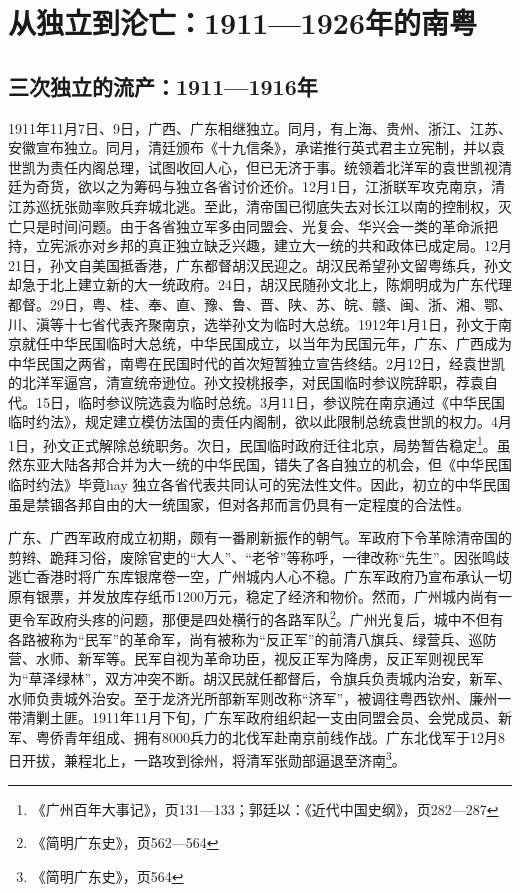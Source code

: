 \chapter{从独立到沦亡：1911—1926年的南粤}

\section{三次独立的流产：1911—1916年}

1911年11月7日、9日，广西、广东相继独立。同月，有上海、贵州、浙江、江苏、安徽宣布独立。同月，清廷颁布《十九信条》，承诺推行英式君主立宪制，并以袁世凯为责任内阁总理，试图收回人心，但已无济于事。统领着北洋军的袁世凯视清廷为奇货，欲以之为筹码与独立各省讨价还价。12月1日，江浙联军攻克南京，清江苏巡抚张勋率败兵弃城北逃。至此，清帝国已彻底失去对长江以南的控制权，灭亡只是时间问题。由于各省独立军多由同盟会、光复会、华兴会一类的革命派把持，立宪派亦对乡邦的真正独立缺乏兴趣，建立大一统的共和政体已成定局。12月21日，孙文自美国抵香港，广东都督胡汉民迎之。胡汉民希望孙文留粤练兵，孙文却急于北上建立新的大一统政府。24日，胡汉民随孙文北上，陈炯明成为广东代理都督。29日，粤、桂、奉、直、豫、鲁、晋、陕、苏、皖、赣、闽、浙、湘、鄂、川、滇等十七省代表齐聚南京，选举孙文为临时大总统。1912年1月1日，孙文于南京就任中华民国临时大总统，中华民国成立，以当年为民国元年，广东、广西成为中华民国之两省，南粤在民国时代的首次短暂独立宣告终结。2月12日，经袁世凯的北洋军逼宫，清宣统帝逊位。孙文投桃报李，对民国临时参议院辞职，荐袁自代。15日，临时参议院选袁为临时总统。3月11日，参议院在南京通过《中华民国临时约法》，规定建立模仿法国的责任内阁制，欲以此限制总统袁世凯的权力。4月1日，孙文正式解除总统职务。次日，民国临时政府迁往北京，局势暂告稳定\footnote{《广州百年大事记》，页131—133；郭廷以：《近代中国史纲》，页282—287}。虽然东亚大陆各邦合并为大一统的中华民国，错失了各自独立的机会，但《中华民国临时约法》毕竟hay 独立各省代表共同认可的宪法性文件。因此，初立的中华民国虽是禁锢各邦自由的大一统国家，但对各邦而言仍具有一定程度的合法性。

广东、广西军政府成立初期，颇有一番刷新振作的朝气。军政府下令革除清帝国的剪辫、跪拜习俗，废除官吏的“大人”、“老爷”等称呼，一律改称“先生”。因张鸣歧逃亡香港时将广东库银席卷一空，广州城内人心不稳。广东军政府乃宣布承认一切原有银票，并发放库存纸币1200万元，稳定了经济和物价。然而，广州城内尚有一更令军政府头疼的问题，那便是四处横行的各路军队\footnote{《简明广东史》，页562—564}。广州光复后，城中不但有各路被称为“民军”的革命军，尚有被称为“反正军”的前清八旗兵、绿营兵、巡防营、水师、新军等。民军自视为革命功臣，视反正军为降虏，反正军则视民军为“草泽绿林”，双方冲突不断。胡汉民就任都督后，令旗兵负责城内治安，新军、水师负责城外治安。至于龙济光所部新军则改称“济军”，被调往粤西钦州、廉州一带清剿土匪。1911年11月下旬，广东军政府组织起一支由同盟会员、会党成员、新军、粤侨青年组成、拥有8000兵力的北伐军赴南京前线作战。广东北伐军于12月8日开拔，兼程北上，一路攻到徐州，将清军张勋部逼退至济南\footnote{《简明广东史》，页564}。

